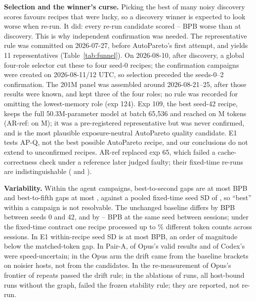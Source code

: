 \documentclass{article}
\newif\ifshowhumanmarkers \showhumanmarkersfalse
\newcommand{\humantag}[1]{{\color{humanframe}\sffamily\scriptsize\bfseries HUMAN AUTHOR MUST REWRITE/VERIFY [#1]}\ }
\newcommand{\humanauthor}[2][]{\ifshowhumanmarkers\begin{humanbox}\humantag{#1}#2\end{humanbox}\else #2\par\fi}
\begin{document}
\humanauthor[P2-09]{\textbf{Selection and the winner's curse.} Picking the best of many noisy discovery scores favours recipes that were lucky, so a discovery winner is expected to look worse when re-run. It did: every re-run candidate scored \CROptMin--\CROptMax{} BPB worse than at discovery. This is why independent confirmation was needed. The representative rule was committed on 2026-07-27, before AutoPareto's first attempt, and yields 11 representatives (Table~\ref{tab:funnel}). On 2026-08-10, after discovery, a global four-role selector cut these to four seed-0 recipes; the confirmation campaigns were created on 2026-08-11/12 UTC, so selection preceded the seeds-0--2 confirmation. The 201M panel was assembled around 2026-08-21--25, after those results were known, and kept three of the four roles; no rule was recorded for omitting the lowest-memory role (exp 124). Exp 109, the best seed-42 recipe, keeps the full 50.3M-parameter model at batch 65,536 and reached \CRExpOneZeroNineBPB{} on \CRExpOneZeroNineTokens M tokens (AR-ref: \CRSeedFortyTwoAR{} on \CRExpSixEightTokens M); it was a pre-registered representative but was never confirmed, and is the most plausible exposure-neutral AutoPareto quality candidate. E1 tests AP-Q, not the best possible AutoPareto recipe, and our conclusions do not extend to unconfirmed recipes. AR-ref replaced exp 65, which failed a cache-correctness check under a reference later judged faulty; their fixed-time re-runs are indistinguishable (\CRFixedSixtyFive{} and \CRFixedSixtyEight).}

\humanauthor[P2-10]{\textbf{Variability.} Within the agent campaigns, best-to-second gaps are at most \CRGapTwoMax{} BPB and best-to-fifth gaps at most \CRGapFiveMax, against a pooled fixed-time seed SD of \CRPooledSD, so ``best'' within a campaign is not resolvable. The unchanged baseline differs by \CRBaseSeedEffect{} BPB between seeds 0 and 42, and by \CRSessionLo--\CRSessionHi{} BPB at the same seed between sessions; under the fixed-time contract one recipe processed up to \CRTokenSpreadMax\% different token counts across sessions. In E1 within-recipe seed SD is at most \CREOneMaxSD{} BPB, an order of magnitude below the matched-token gap. In Pair-A, \CROpUncertain{} of Opus's \CROpValid{} valid results and \CRCxUncertain{} of Codex's \CRCxValid{} were speed-uncertain; in the Opus arm the drift came from the baseline brackets on noisier hosts, not from the candidates. In the re-measurement of Opus's frontier \CROpStableRepeats{} of \CROpRepeats{} repeats passed the drift rule; in the ablations \CRIAUnstable{} of \CRIARuns{} runs, all host-bound runs without the graph, failed the frozen stability rule; they are reported, not re-run.}
\end{document}

